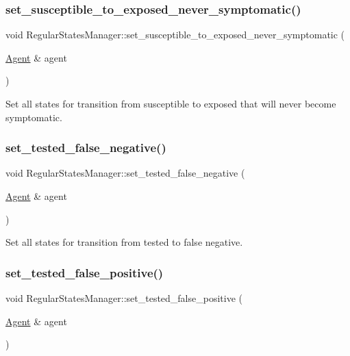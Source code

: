 \subsubsection{\texorpdfstring{set\+\_\+susceptible\+\_\+to\+\_\+exposed\+\_\+never\+\_\+symptomatic()}{set\_susceptible\_to\_exposed\_never\_symptomatic()}}
{\footnotesize\ttfamily void Regular\+States\+Manager\+::set\+\_\+susceptible\+\_\+to\+\_\+exposed\+\_\+never\+\_\+symptomatic (\begin{DoxyParamCaption}\item[{\hyperlink{classAgent}{Agent} \&}]{agent }\end{DoxyParamCaption})}



Set all states for transition from susceptible to exposed that will never become symptomatic. 

\mbox{\label{classRegularStatesManager_a82b160b267cc70b5c599119fd278936d}} 
\subsubsection{\texorpdfstring{set\+\_\+tested\+\_\+false\+\_\+negative()}{set\_tested\_false\_negative()}}
{\footnotesize\ttfamily void Regular\+States\+Manager\+::set\+\_\+tested\+\_\+false\+\_\+negative (\begin{DoxyParamCaption}\item[{\hyperlink{classAgent}{Agent} \&}]{agent }\end{DoxyParamCaption})}



Set all states for transition from tested to false negative. 

\mbox{\label{classRegularStatesManager_a7bdff7e59ae0d521f32ec1a33d7c2c41}} 
\subsubsection{\texorpdfstring{set\+\_\+tested\+\_\+false\+\_\+positive()}{set\_tested\_false\_positive()}}
{\footnotesize\ttfamily void Regular\+States\+Manager\+::set\+\_\+tested\+\_\+false\+\_\+positive (\begin{DoxyParamCaption}\item[{\hyperlink{classAgent}{Agent} \&}]{agent }\end{DoxyParamCaption})}




